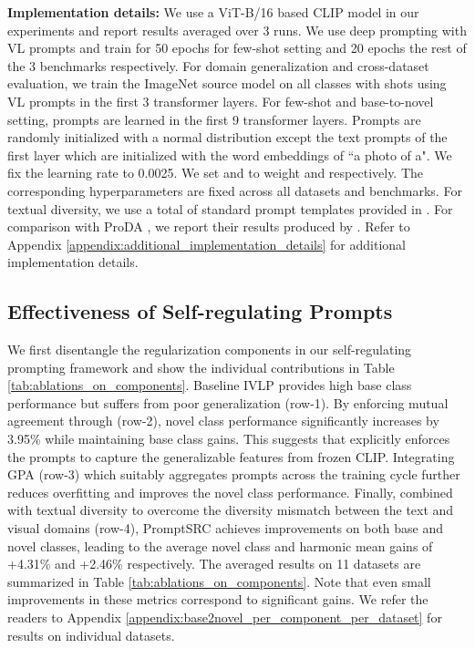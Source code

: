 \documentclass[10pt,twocolumn,letterpaper]{article}
\begin{document}
\noindent \textbf{Implementation details:} We use a ViT-B/16 based CLIP model in our experiments and report results averaged over 3 runs. We use deep prompting with  VL prompts and train for 50 epochs for few-shot setting and 20 epochs the rest of the 3 benchmarks respectively.  For domain generalization and cross-dataset evaluation, we train the ImageNet source model on all classes with  shots using  VL prompts in the first 3 transformer layers. For few-shot and base-to-novel setting, prompts are learned in the first 9 transformer layers. Prompts are randomly initialized with a normal distribution except the text prompts of the first layer which are initialized with the word embeddings of ``a photo of a". We fix the learning rate to 0.0025. We set  and  to weight  and  respectively. The corresponding hyperparameters are fixed across all datasets and benchmarks. For textual diversity, we use a total of  standard prompt templates provided in \cite{radford2021learning}. For comparison with ProDA \cite{lu2022prompt}, we report their results produced by \cite{derakhshani2022variational}. Refer to Appendix \ref{appendix:additional_implementation_details} for additional implementation details.
\subsection{Effectiveness of Self-regulating Prompts}
We first disentangle the regularization components in our self-regulating prompting framework and show the individual contributions in Table \ref{tab:ablations_on_components}.
Baseline IVLP provides high base class performance but suffers from poor generalization (row-1). By enforcing mutual agreement through  (row-2), novel class performance significantly increases by 3.95\% while maintaining base class gains. This suggests that  explicitly enforces the prompts to capture the generalizable features from frozen CLIP. 
Integrating GPA (row-3) which suitably aggregates prompts across the training cycle further reduces overfitting and improves the novel class performance. Finally, combined with textual diversity to overcome the diversity mismatch between the text and visual domains (row-4), PromptSRC achieves improvements on both base and novel classes, leading to the average novel class and harmonic mean gains of +4.31\% and +2.46\% respectively. The averaged results on 11 datasets are summarized in Table \ref{tab:ablations_on_components}. Note that even small improvements in these metrics correspond to significant gains. We refer the readers to Appendix \ref{appendix:base2novel_per_component_per_dataset} for results on individual datasets.
\end{document}
